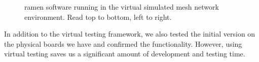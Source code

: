 \begin{figure}[H]
    \centering
    \qquad
    \caption{ramen software running in the virtual simulated mesh network environment. Read top to bottom, left to right.}
    \label{fig:virtual_ramen}%
    \medskip
\end{figure}

In addition to the virtual testing framework, we also tested the initial version on the physical boards we have and confirmed the functionality. However, using virtual testing saves us a significant amount of development and testing time.